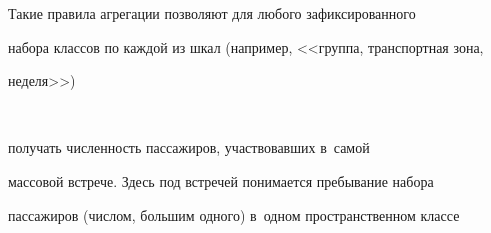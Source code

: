       


      Такие правила агрегации позволяют для любого зафиксированного 


набора классов по каждой из шкал (например, <<группа, транспортная зона, 


неделя>>)\linebreak\vspace*{-12pt}





\pagebreak





\





\vspace*{-12pt}













\noindent


 получать численность пассажиров, участвовавших в~самой 


массовой встрече. Здесь под встречей понимается пребывание набора 


пассажиров (числом, большим одного) в~одном пространственном классе 



